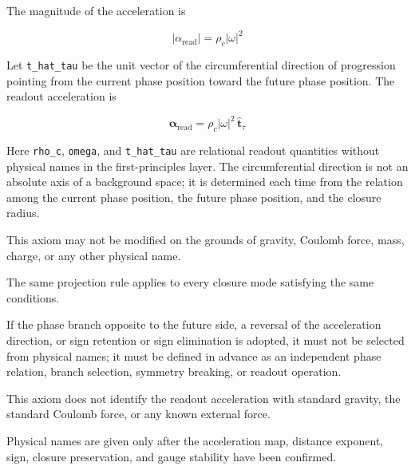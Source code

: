 \documentclass[
  a4paper,
]{article}
\begin{document}
The magnitude of the acceleration is

\[
|\alpha_{\mathrm{read}}|
=\rho_c|\omega|^2
\]

Let \texttt{t\_hat\_tau} be the unit vector of the circumferential
direction of progression pointing from the current phase position toward
the future phase position. The readout acceleration is

\[
\boldsymbol{\alpha}_{\mathrm{read}}
=\rho_c|\omega|^2\,\hat{\boldsymbol{t}}_\tau
\]

Here \texttt{rho\_c}, \texttt{omega}, and \texttt{t\_hat\_tau} are
relational readout quantities without physical names in the
first-principles layer. The circumferential direction is not an absolute
axis of a background space; it is determined each time from the relation
among the current phase position, the future phase position, and the
closure radius.

This axiom may not be modified on the grounds of gravity, Coulomb force,
mass, charge, or any other physical name.

The same projection rule applies to every closure mode satisfying the
same conditions.

If the phase branch opposite to the future side, a reversal of the
acceleration direction, or sign retention or sign elimination is
adopted, it must not be selected from physical names; it must be defined
in advance as an independent phase relation, branch selection, symmetry
breaking, or readout operation.

This axiom does not identify the readout acceleration with standard
gravity, the standard Coulomb force, or any known external force.

Physical names are given only after the acceleration map, distance
exponent, sign, closure preservation, and gauge stability have been
confirmed.
\end{document}
